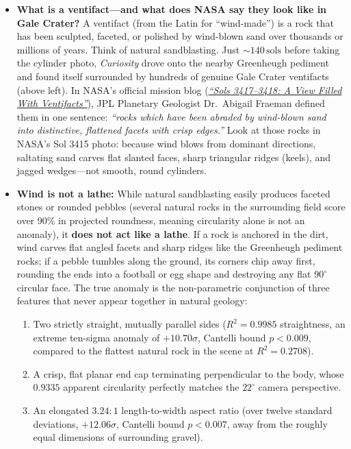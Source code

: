 \documentclass[11pt,a4paper]{article}
\begin{document}
\begin{itemize}
	\item \textbf{What is a ventifact---and what does NASA say they look like in Gale Crater?} A ventifact (from the Latin for ``wind-made'') is a rock that has been sculpted, faceted, or polished by wind-blown sand over thousands or millions of years. Think of natural sandblasting. Just $\sim 140\,\text{sols}$ before taking the cylinder photo, \textit{Curiosity} drove onto the nearby Greenheugh pediment and found itself surrounded by hundreds of genuine Gale Crater ventifacts (above left). In NASA's official mission blog (\href{https://science.nasa.gov/blog/sols-3417-3418-a-view-filled-with-ventifacts/}{\textit{``Sols 3417--3418: A View Filled With Ventifacts''}}), JPL Planetary Geologist Dr.~Abigail Fraeman defined them in one sentence: \textit{``rocks which have been abraded by wind-blown sand into distinctive, flattened facets with crisp edges.''} Look at those rocks in NASA's Sol 3415 photo: because wind blows from dominant directions, saltating sand carves flat slanted faces, sharp triangular ridges (keels), and jagged wedges---not smooth, round cylinders.
	\item \textbf{Wind is not a lathe:} While natural sandblasting easily produces faceted stones or rounded pebbles (several natural rocks in the surrounding field score over 90\% in projected roundness, meaning circularity alone is not an anomaly), it \textbf{does not act like a lathe}. If a rock is anchored in the dirt, wind carves flat angled facets and sharp ridges like the Greenheugh pediment rocks; if a pebble tumbles along the ground, its corners chip away first, rounding the ends into a football or egg shape and destroying any flat $90^\circ$ circular face. The true anomaly is the non-parametric conjunction of three features that never appear together in natural geology:
	      \begin{enumerate}
		      \item Two strictly straight, mutually parallel sides ($R^2 = 0.9985$ straightness, an extreme ten-sigma anomaly of $+10.70\sigma$, Cantelli bound $p < 0.009$, compared to the flattest natural rock in the scene at $R^2 = 0.2708$).
		      \item A crisp, flat planar end cap terminating perpendicular to the body, whose $0.9335$ apparent circularity perfectly matches the $22^\circ$ camera perspective.
		      \item An elongated $3.24 : 1$ length-to-width aspect ratio (over twelve standard deviations, $+12.06\sigma$, Cantelli bound $p < 0.007$, away from the roughly equal dimensions of surrounding gravel).

\end{enumerate}
\end{itemize}
\end{document}
